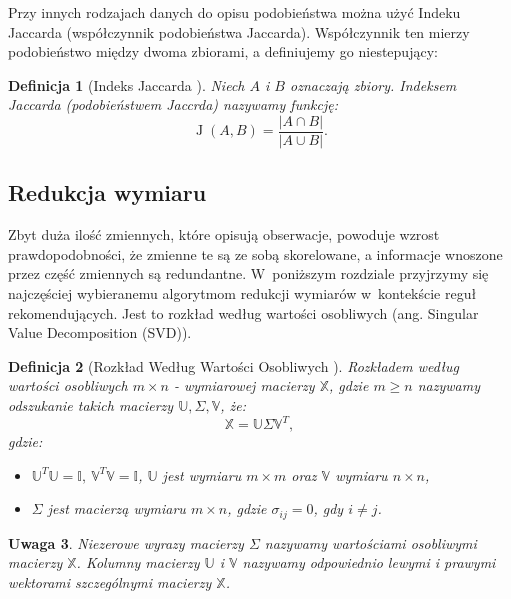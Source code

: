 \documentclass[12pt,a4paper]{report}
\newtheorem{df}{Definicja}[chapter]
\newtheorem{uwaga}[df]{Uwaga}
\newcommand{\J}[2]{\operatorname{J}\left({#1}, {#2} \right)}
\begin{document}
Przy innych rodzajach danych do opisu podobieństwa można użyć Indeku Jaccarda (współczynnik podobieństwa Jaccarda).  Współczynnik ten mierzy podobieństwo między dwoma zbiorami, a definiujemy go niestepujący:

\begin{df}[Indeks Jaccarda  \citep{bre}]
Niech $\mathit{A}$ i $\mathit{B}$ oznaczają zbiory. Indeksem Jaccarda (podobieństwem Jaccrda) nazywamy funkcję:
$$
\J{\mathit{A}}{\mathit{B}}=\frac{|\mathit{A}\cap \mathit{B}|}{|\mathit{A} \cup \mathit{B}|}.
$$
\end{df}

\subsection{Redukcja wymiaru}
Zbyt duża ilość zmiennych, które opisują obserwacje, powoduje wzrost prawdopodobności, że zmienne te są ze sobą skorelowane, a informacje wnoszone przez część zmiennych są redundantne. W~poniższym rozdziale przyjrzymy się najczęściej wybieranemu algorytmom redukcji wymiarów w~kontekście reguł rekomendujących. Jest to rozkład według wartości osobliwych (ang. Singular Value Decomposition (SVD)).

\begin{df} [Rozkład Według Wartości Osobliwych {\citep{ulafiir}}]%
Rozkładem według wartości osobliwych $m\times n$ - wymiarowej macierzy $\mathbb{X}$, gdzie $m\geq n$ nazywamy odszukanie takich macierzy $\mathbb{U}, \Sigma, \mathbb{V}$, że:
$$
\mathbb{X}=\mathbb{U} \Sigma \mathbb{V}^T,
$$
gdzie:
\begin{itemize}
\item $\mathbb{U}^T \mathbb{U} =\mathbb{I}, \:  \mathbb{V}^T \mathbb{V} = \mathbb{I}$, $\mathbb{U}$ jest wymiaru $m \times m$ oraz $\mathbb{V}$ wymiaru $n \times n$,
\item $\Sigma$ jest macierzą wymiaru $m \times n$, gdzie $\sigma_{ij} = 0$, gdy $i \neq j$.	
\end{itemize}
\end{df}

\begin{uwaga}{\citep{ulafiir}}
Niezerowe wyrazy macierzy $\Sigma$ nazywamy wartościami osobliwymi macierzy $\mathbb{X}$.
Kolumny macierzy $\mathbb{U}$ i $\mathbb{V}$ nazywamy odpowiednio lewymi i prawymi wektorami szczególnymi macierzy $\mathbb{X}$.
\end{uwaga}
\end{document}
